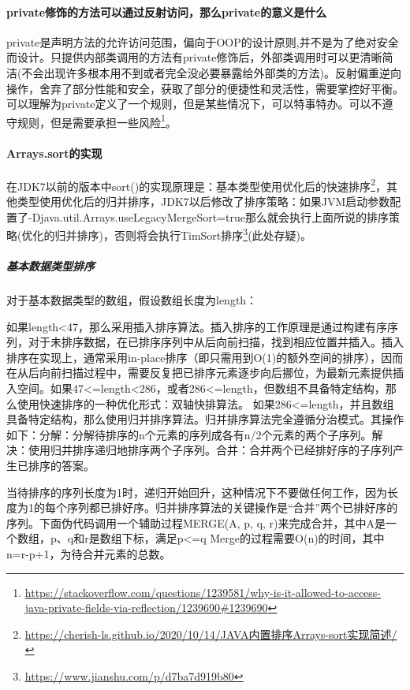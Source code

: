 \documentclass[../../../interview-questions.tex]{subfiles}
\begin{document}
\paragraph{private修饰的方法可以通过反射访问，那么private的意义是什么}

private是声明方法的允许访问范围，偏向于OOP的设计原则,并不是为了绝对安全而设计。只提供内部类调用的方法有private修饰后，外部类调用时可以更清晰简洁(不会出现许多根本用不到或者完全没必要暴露给外部类的方法)。反射偏重逆向操作，舍弃了部分性能和安全，获取了部分的便捷性和灵活性，需要掌控好平衡。可以理解为private定义了一个规则，但是某些情况下，可以特事特办。可以不遵守规则，但是需要承担一些风险\footnote{\url{https://stackoverflow.com/questions/1239581/why-is-it-allowed-to-access-java-private-fields-via-reflection/1239690\#1239690}}。


\paragraph{Arrays.sort的实现}

在JDK7以前的版本中sort()的实现原理是：基本类型使用优化后的快速排序\footnote{\url{https://cherish-ls.github.io/2020/10/14/JAVA内置排序Arrays-sort实现简述/}}，其他类型使用优化后的归并排序，JDK7以后修改了排序策略：如果JVM启动参数配置了-Djava.util.Arrays.useLegacyMergeSort=true那么就会执行上面所说的排序策略(优化的归并排序)，否则将会执行TimSort排序\footnote{\url{https://www.jianshu.com/p/d7ba7d919b80}}(此处存疑)。

\subparagraph{基本数据类型排序}

对于基本数据类型的数组，假设数组长度为length：


如果length<47，那么采用插入排序算法。插入排序的工作原理是通过构建有序序列，对于未排序数据，在已排序序列中从后向前扫描，找到相应位置并插入。插入排序在实现上，通常采用in-place排序（即只需用到O(1)的额外空间的排序），因而在从后向前扫描过程中，需要反复把已排序元素逐步向后挪位，为最新元素提供插入空间。如果47<=length<286，或者286<=length，但数组不具备特定结构，那么使用快速排序的一种优化形式：双轴快排算法。
如果286<=length，并且数组具备特定结构，那么使用归并排序算法。归并排序算法完全遵循分治模式。其操作如下：分解：分解待排序的n个元素的序列成各有n/2个元素的两个子序列。解决：使用归并排序递归地排序两个子序列。合并：合并两个已经排好序的子序列产生已排序的答案。

当待排序的序列长度为1时，递归开始回升，这种情况下不要做任何工作，因为长度为1的每个序列都已排好序。归并排序算法的关键操作是“合并”两个已排好序的序列。下面伪代码调用一个辅助过程MERGE(A, p, q, r)来完成合并，其中A是一个数组，p、q和r是数组下标，满足p<=q Merge的过程需要O(n)的时间，其中n=r-p+1，为待合并元素的总数。
\end{document}
